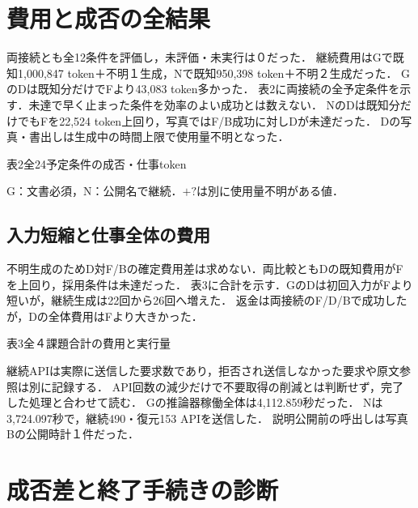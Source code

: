 \documentclass[letter]{ieicej}
\begin{document}
\section{費用と成否の全結果}
両接続とも全12条件を評価し，未評価・未実行は０だった．
継続費用はGで既知1,000,847 token＋不明１生成，Nで既知950,398 token＋不明２生成だった．
GのDは既知分だけでFより43,083 token多かった．
表2に両接続の全予定条件を示す．未達で早く止まった条件を効率のよい成功とは数えない．
NのDは既知分だけでもFを22,524 token上回り，写真ではF/B成功に対しDが未達だった．
Dの写真・書出しは生成中の時間上限で使用量不明となった．

\begin{center}\begin{minipage}{\columnwidth}\centering
\small 表2\quad 全24予定条件の成否・仕事token\par\smallskip
\PublicDisplayAllCells
\par\smallskip\footnotesize G：文書必須，N：公開名で継続．$+?$は別に使用量不明がある値．
\end{minipage}\end{center}

\subsection{入力短縮と仕事全体の費用}
不明生成のためD対F/Bの確定費用差は求めない．両比較ともDの既知費用がFを上回り，採用条件は未達だった．
表3に合計を示す．GのDは初回入力がFより短いが，継続生成は22回から26回へ増えた．
返金は両接続のF/D/Bで成功したが，Dの全体費用はFより大きかった．

\begin{center}\begin{minipage}{\columnwidth}\centering
\small 表3\quad 全４課題合計の費用と実行量\par\smallskip
\PublicDisplayTotals
\end{minipage}\end{center}

継続APIは実際に送信した要求数であり，拒否され送信しなかった要求や原文参照は別に記録する．
API回数の減少だけで不要取得の削減とは判断せず，完了した処理と合わせて読む．
Gの推論器稼働全体は4,112.859秒だった．
Nは3,724.097秒で，継続490・復元153 APIを送信した．
説明公開前の呼出しは写真Bの公開時計１件だった．

\section{成否差と終了手続きの診断}

\end{document}
